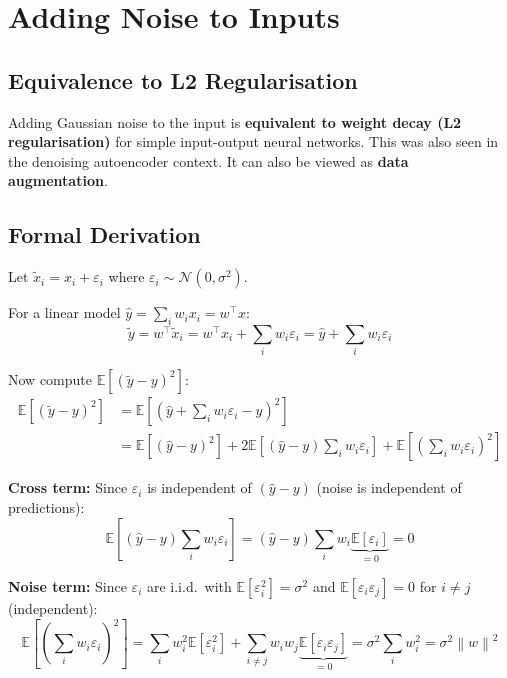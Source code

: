 \documentclass[12pt,a4paper]{article}
\newcommand{\E}{\mathbb{E}}
\newcommand{\norm}[1]{\left\|#1\right\|}
\begin{document}
\section{Adding Noise to Inputs}

\subsection{Equivalence to L2 Regularisation}

Adding Gaussian noise to the input is \textbf{equivalent to weight decay (L2 regularisation)} for simple input-output neural networks. This was also seen in the denoising autoencoder context. It can also be viewed as \textbf{data augmentation}.

\subsection{Formal Derivation}

Let $\tilde{x}_i = x_i + \varepsilon_i$ where $\varepsilon_i \sim \mathcal{N}(0, \sigma^2)$.

For a linear model $\hat{y} = \sum_i w_i x_i = w^\top x$:
\[
\tilde{y} = w^\top\tilde{x}_i = w^\top x_i + \sum_i w_i\varepsilon_i
= \hat{y} + \sum_i w_i\varepsilon_i
\]

Now compute $\E[(\tilde{y}-y)^2]$:
\begin{align*}
\E[(\tilde{y}-y)^2]
&= \E\!\left[\left(\hat{y} + \sum_i w_i\varepsilon_i - y\right)^2\right]\\
&= \E[(\hat{y}-y)^2]
  + 2\E\!\left[(\hat{y}-y)\sum_i w_i\varepsilon_i\right]
  + \E\!\left[\left(\sum_i w_i\varepsilon_i\right)^2\right]
\end{align*}

\textbf{Cross term:} Since $\varepsilon_i$ is independent of $(\hat{y}-y)$ (noise is independent of predictions):
\[
\E\!\left[(\hat{y}-y)\sum_i w_i\varepsilon_i\right] = (\hat{y}-y)\sum_i w_i\underbrace{\E[\varepsilon_i]}_{=0} = 0
\]

\textbf{Noise term:} Since $\varepsilon_i$ are i.i.d.\ with $\E[\varepsilon_i^2]=\sigma^2$ and $\E[\varepsilon_i\varepsilon_j]=0$ for $i\neq j$ (independent):
\[
\E\!\left[\left(\sum_i w_i\varepsilon_i\right)^2\right]
= \sum_i w_i^2\E[\varepsilon_i^2] + \sum_{i\neq j}w_iw_j\underbrace{\E[\varepsilon_i\varepsilon_j]}_{=0}
= \sigma^2\sum_i w_i^2
= \sigma^2\norm{w}^2
\]
\end{document}
